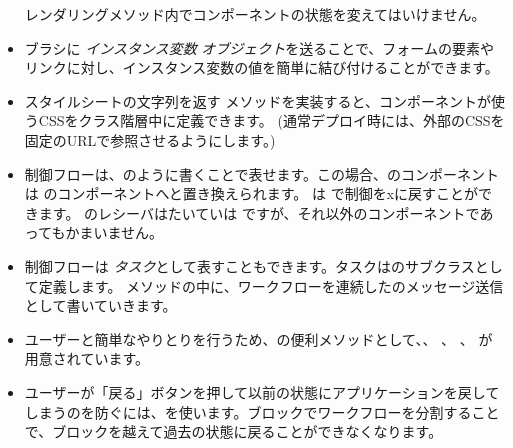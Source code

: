 \documentclass[a4paper,10pt,twoside]{book}
\begin{document}
\begin{itemize}
レンダリングメソッド内でコンポーネントの状態を変えてはいけません。
  \item ブラシに \emph{インスタンス変数}  \emph{オブジェクト}を送ることで、フォームの要素やリンクに対し、インスタンス変数の値を簡単に結び付けることができます。
  \item スタイルシートの文字列を返す メソッドを実装すると、コンポーネントが使うCSSをクラス階層中に定義できます。
    (通常デプロイ時には、外部のCSSを固定のURLで参照させるようにします。)
  \item 制御フローは、のように書くことで表せます。この場合、のコンポーネントは のコンポーネントへと置き換えられます。  は  で制御をxに戻すことができます。
    のレシーバはたいていは ですが、それ以外のコンポーネントであってもかまいません。
  \item 制御フローは \emph{タスク}として表すこともできます。タスクはのサブクラスとして定義します。 メソッドの中に、ワークフローを連続したのメッセージ送信として書いていきます。
  \item ユーザーと簡単なやりとりを行うため、の便利メソッドとして、、 、 、 が用意されています。
  \item ユーザーが「戻る」ボタンを押して以前の状態にアプリケーションを戻してしまうのを防ぐには、を使います。ブロックでワークフローを分割することで、ブロックを越えて過去の状態に戻ることができなくなります。
\end{itemize}

\ifx\wholebook\relax\else 
   
   
\end{document}
